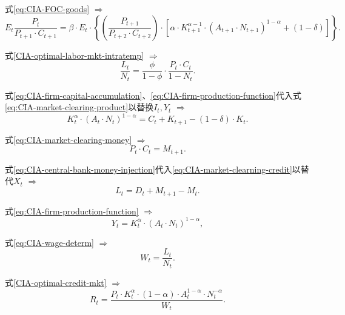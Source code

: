 式\eqref{eq:CIA-FOC-goods} $\Rightarrow$
  \begin{equation*}
    E_t \frac{P_t}{P_{t+1} \cdot C_{t+1}} = \beta \cdot E_t \cdot
    \left\{
  \left( \frac{P_{t+1}}{P_{t+2} \cdot C_{t+2}} \right) \cdot
  \left[
    \alpha \cdot K_{t+1}^{\alpha -1} \cdot
    \left(A_{t+1} \cdot N_{t+1} \right)^{1-\alpha} + (1-\delta)
  \right]
    \right\}.
  \end{equation*}

式\eqref{CIA-optimal-labor-mkt-intratemp} $\Rightarrow$
  \begin{equation*}
    \frac{L_t}{N_t}=\frac{\phi}{1-\phi} \cdot \frac{P_t \cdot C_t}{1-N_t}.
  \end{equation*}

式\eqref{eq:CIA-firm-capital-accumulation}、\eqref{eq:CIA-firm-production-function}代入式\eqref{eq:CIA-market-clearing-product}以替换$I_t, Y_t$ $\Rightarrow$
    \begin{equation}
    \label{eq:CIA-equil-cond-unscal-resource}
      K_t^{\alpha} \cdot \left( A_t \cdot N_t \right)^{1-\alpha} = C_t + K_{t+1} - \left( 1 - \delta \right) \cdot K_t.
    \end{equation}

式\eqref{eq:CIA-market-clearing-money} $\Rightarrow$
  \begin{equation*}
    P_t \cdot C_t = M_{t+1}.
  \end{equation*}

式\eqref{eq:CIA-central-bank-money-injection}代入\eqref{eq:CIA-market-clearning-credit}以替代$X_t$ $\Rightarrow$
  \begin{equation}
    \label{eq:CIA-equil-cond-unscal-credit}
    L_t = D_t + M_{t+1} - M_{t}.
  \end{equation}

式\eqref{eq:CIA-firm-production-function} $\Rightarrow$
  \begin{equation*}
    Y_t = K_t^{\alpha} \cdot (A_t \cdot N_t)^{1-\alpha},
  \end{equation*}

式\eqref{eq:CIA-wage-determ} $\Rightarrow$
  \begin{equation*}
    W_t = \frac{L_t}{N_t}.
  \end{equation*}

式\eqref{CIA-optimal-credit-mkt} $\Rightarrow$
  \begin{equation*}
    R_t = \frac{P_t \cdot K_t^{\alpha} \cdot (1-\alpha) \cdot A_t^{1- \alpha} \cdot N_t^{-\alpha}}{W_t}.
  \end{equation*}

